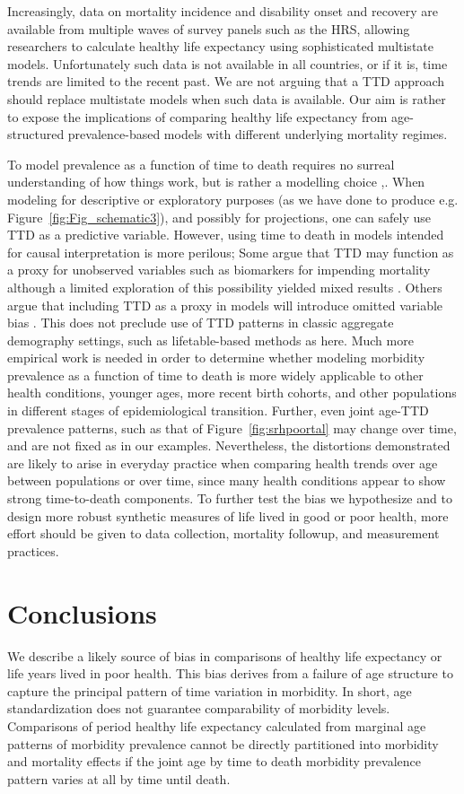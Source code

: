 \documentclass[12pt,oneside,a4paper]{article} %
\begin{document}
Increasingly, data on mortality incidence and disability onset and recovery are available from
multiple waves of survey panels such as the HRS, allowing researchers to
calculate healthy life expectancy using sophisticated multistate models.
Unfortunately such data is not available in all countries, or if it is, time
trends are limited to the recent past. We are not arguing that a TTD approach
should replace multistate models when such data is available. Our aim is rather
to expose the implications of comparing healthy life expectancy from
age-structured prevalence-based models with different underlying mortality
regimes.

To model prevalence as a function of
time to death requires no surreal understanding of how things work, but is
rather a modelling choice \citep{wolf2015disability},. When modeling for
descriptive or exploratory purposes (as we have done to produce e.g. Figure~\ref{fig:Fig_schematic3}),
and possibly for projections, one can safely use
TTD as a predictive variable.
However, using time to death in models intended for causal interpretation is more perilous; Some argue that TTD may function as a proxy for unobserved variables such as biomarkers for impending mortality \citep{wolf2015disability} although a limited exploration of this possibility yielded mixed results \citep{rehkopf2016cross}. Others argue that including TTD as a proxy in models will introduce omitted variable bias \citep{lynch2015commentary}. This does not preclude use of TTD patterns in classic aggregate demography settings, such as lifetable-based methods as here. Much more empirical work is needed in order to determine whether modeling morbidity
prevalence as a function of time to death is more widely applicable to
other health conditions, younger ages, more recent birth
cohorts, and other populations in different stages of epidemiological
transition. Further, even joint age-TTD prevalence patterns, such as that of Figure~\ref{fig:srhpoortal} may change over time, and are not fixed as in our examples. Nevertheless, the distortions demonstrated are likely to arise in everyday practice when comparing health trends over age between populations or over time, since many health conditions appear to show strong time-to-death components. To further test the bias we hypothesize and to design more robust synthetic measures of life lived in good or poor health, more effort should be given to data collection, mortality followup, and measurement practices.

\section{Conclusions}
We describe a likely source of bias in comparisons of healthy life expectancy or life years lived in poor health. This bias derives from a failure of age structure to capture the principal pattern of time variation in morbidity. In short, age standardization does not guarantee comparability of morbidity levels. Comparisons of period healthy life expectancy calculated from marginal age patterns of morbidity prevalence cannot be directly partitioned into morbidity and mortality effects if the joint age by time to death morbidity prevalence pattern varies at all by time until death. 
\end{document}
